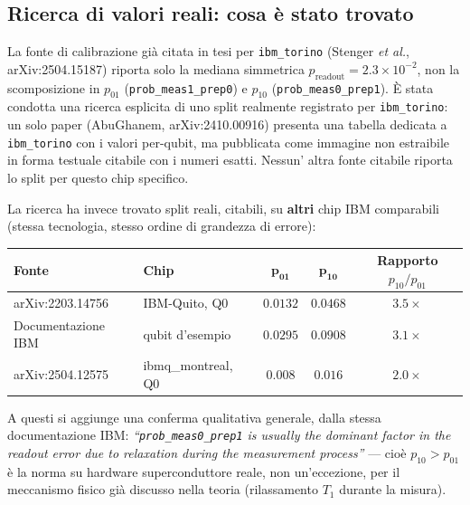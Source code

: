 \documentclass[11pt,a4paper]{article}
\begin{document}
\subsection{Ricerca di valori reali: cosa è stato trovato}
\label{sec:ricerca}

La fonte di calibrazione già citata in tesi per \texttt{ibm\_torino}
(Stenger \emph{et al.}, arXiv:2504.15187) riporta solo la mediana
simmetrica $p_\text{readout}=2.3\times10^{-2}$, non la scomposizione in
$p_{01}$ (\texttt{prob\_meas1\_prep0}) e $p_{10}$
(\texttt{prob\_meas0\_prep1}). È stata condotta una ricerca esplicita di
uno split realmente registrato per \texttt{ibm\_torino}: un solo paper
(AbuGhanem, arXiv:2410.00916) presenta una tabella dedicata a
\texttt{ibm\_torino} con i valori per-qubit, ma pubblicata come immagine
non estraibile in forma testuale citabile con i numeri esatti. Nessun'
altra fonte citabile riporta lo split per questo chip specifico.

La ricerca ha invece trovato split reali, citabili, su \textbf{altri} chip
IBM comparabili (stessa tecnologia, stesso ordine di grandezza di errore):

\begin{center}
\renewcommand{\arraystretch}{1.3}
\begin{tabular}{@{}llccc@{}}
\toprule
\textbf{Fonte} & \textbf{Chip} & $\boldsymbol{p_{01}}$ & $\boldsymbol{p_{10}}$ & \textbf{Rapporto} $p_{10}/p_{01}$\\
\midrule
arXiv:2203.14756 & IBM-Quito, Q0 & $0.0132$ & $0.0468$ & $3.5\times$\\
Documentazione IBM\footnotemark & qubit d'esempio & $0.0295$ & $0.0908$ & $3.1\times$\\
arXiv:2504.12575 & ibmq\_montreal, Q0 & $0.008$ & $0.016$ & $2.0\times$\\
\bottomrule
\end{tabular}
\end{center}

\noindent A questi si aggiunge una conferma qualitativa generale, dalla
stessa documentazione IBM: \emph{``\texttt{prob\_meas0\_prep1} is usually
the dominant factor in the readout error due to relaxation during the
measurement process''} --- cioè $p_{10}>p_{01}$ è la norma su hardware
superconduttore reale, non un'eccezione, per il meccanismo fisico già
discusso nella teoria (rilassamento $T_1$ durante la misura).
\end{document}
